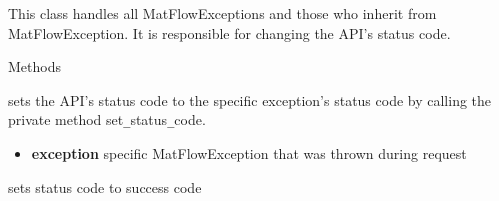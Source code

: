 This class handles all MatFlowExceptions and those who inherit from MatFlowException. It is  
responsible for changing the API's status code.

\begin{methodenv}{Methods}

sets the API's status code to the specific exception's status code by calling the private method
set\texttt{\_}status\texttt{\_}code.
\begin{itemize}
        \item \textbf{exception}
        specific MatFlowException that was thrown during request
\end{itemize}

sets status code to success code

\end{methodenv}

